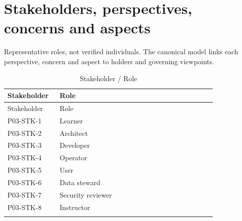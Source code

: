 \documentclass[10pt,letterpaper]{article}
\begin{document}
\section{Stakeholders, perspectives, concerns and aspects}
Representative roles, not verified individuals. The canonical model links each perspective, concern and aspect to holders and governing viewpoints.
\begin{longtable}{@{}>{\raggedright\arraybackslash}p{0.23\linewidth}>{\raggedright\arraybackslash}p{0.69\linewidth}@{}}
\caption{Stakeholder / Role}\\
\toprule Stakeholder & Role\\\midrule\endfirsthead
\toprule Stakeholder & Role\\\midrule\endhead
P03-STK-1 & Learner\\\addlinespace
P03-STK-2 & Architect\\\addlinespace
P03-STK-3 & Developer\\\addlinespace
P03-STK-4 & Operator\\\addlinespace
P03-STK-5 & User\\\addlinespace
P03-STK-6 & Data steward\\\addlinespace
P03-STK-7 & Security reviewer\\\addlinespace
P03-STK-8 & Instructor\\\addlinespace
\bottomrule\end{longtable}
\end{document}

